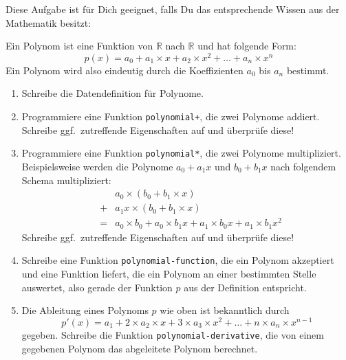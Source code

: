 \begin{aufgabe}
  Diese Aufgabe ist für Dich geeignet, falls Du das entsprechende
  Wissen aus der Mathematik besitzt:

  Ein Polynom ist eine Funktion von $\mathbb{R}$ nach $\mathbb{R}$ und
  hat folgende Form:
  \begin{displaymath}
    p(x) = a_0 +
    a_1 \times x + a_2 \times x^2 + \ldots + a_n \times x^n    
  \end{displaymath}
  Ein Polynom wird also eindeutig durch die Koeffizienten $a_0$ bis
  $a_n$ bestimmt.

  \begin{enumerate}
   \item Schreibe die Datendefinition für Polynome.
   \item Programmiere eine Funktion \lstinline{polynomial+}, die
     zwei Polynome addiert.  Schreibe ggf.\ zutreffende Eigenschaften auf
     und überprüfe diese!
     
   \item Programmiere eine Funktion \lstinline{polynomial*}, die zwei Polynome 
     multipliziert. 
     Beispielsweise werden die Polynome $a_0+a_1 x$ und $b_0+b_1 x$ nach folgendem Schema multipliziert:
     \begin{eqnarray*}
     & &a_0 \times (b_0+b_1\times x) \\
     &+&a_1 x \times (b_0+b_1\times x) \\ 
     &=&a_0\times b_0+a_0\times b_1 x + a_1\times b_0x + a_1\times b_1x^2
     \end{eqnarray*}	
     Schreibe ggf.\ zutreffende Eigenschaften auf und überprüfe diese!
   \item Schreibe eine Funktion \lstinline{polynomial-function}, die
     ein Polynom akzeptiert und eine Funktion liefert, die ein Polynom
     an einer bestimmten Stelle auswertet, also gerade der Funktion
     $p$ aus der Definition entspricht. 
   \item Die Ableitung eines Polynoms $p$ wie oben ist bekanntlich durch
     \begin{displaymath}
       p'(x) = a_1 + 2\times a_2 \times x + 3\times a_3\times x^2 + \ldots
       + n \times a_n \times x^{n-1}
     \end{displaymath}
     gegeben. Schreibe die Funktion
     \lstinline{polynomial-derivative}, die von einem gegebenen Polynom das abgeleitete Polynom
     berechnet.
 \end{enumerate}
\end{aufgabe}


